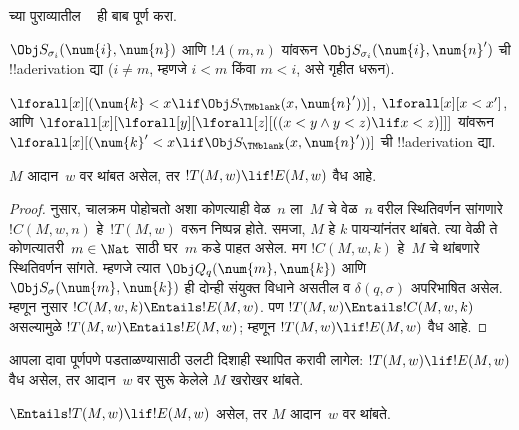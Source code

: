 \documentclass[../../../include/open-logic-section]{subfiles}
\begin{document}
\begin{prob}
च्या पुराव्यातील
~
ही बाब पूर्ण करा.
\end{prob}

\begin{prob}
$\Obj S_{\sigma_i}(\num{i}, \num{n})$
आणि $!A(m, n)$ यांवरून
$\Obj S_{\sigma_i}(\num{i}, \num{n}')$
ची !!a{derivation} द्या
($i \neq
m$, म्हणजे $i < m$
किंवा $m < i$,
असे गृहीत धरून).
\end{prob}

\begin{prob}
$\lforall[x][(\num{k} < x \lif \Obj
  S_\TMblank(x, \num{n}'))]$,
$\lforall[x][x < x']$,
आणि
$\lforall[x][\lforall[y][\lforall[z][ ((x < y \land y < z) \lif x <
      z)]]]$
यांवरून
$\lforall[x][(\num{k}' < x \lif \Obj
  S_\TMblank(x, \num{n}'))]$
ची !!a{derivation} द्या.
\end{prob}


\begin{lem}
$M$ आदान~$w$ वर
थांबत असेल, तर
$!T(M, w) \lif
!E(M, w)$ वैध आहे.
\end{lem}

\begin{proof}
 नुसार,
चालक्रम पोहोचतो अशा कोणत्याही वेळ~$n$
ला~$M$ चे वेळ~$n$ वरील स्थितिवर्णन
सांगणारे~$!C(M, w, n)$
हे~$!T(M, w)$ वरून
निष्पन्न होते. समजा,
$M$ हे $k$ पायऱ्यांनंतर
थांबते. त्या वेळी
ते कोणत्यातरी~$m \in \Nat$
साठी घर~$m$ कडे
पाहत असेल. मग
$!C(M, w, k)$ हे~$M$
चे थांबणारे स्थितिवर्णन
सांगते. म्हणजे त्यात
$\Obj Q_q(\num{m}, \num{k})$
आणि $\Obj
S_\sigma(\num{m}, \num{k})$
ही दोन्ही संयुक्त विधाने
असतील व $\delta(q,\sigma)$
अपरिभाषित असेल. म्हणून
नुसार
$!C(M, w, k) \Entails !E(M,
w)$. पण
$!T(M, w) \Entails !C(M, w, k)$
असल्यामुळे
$!T(M, w)
\Entails !E(M, w)$;
म्हणून $!T(M, w) \lif !E(M, w)$
वैध आहे.
\end{proof}


\begin{explain} 
आपला दावा पूर्णपणे
पडताळण्यासाठी उलटी
दिशाही स्थापित करावी
लागेल: $!T(M, w) \lif !E(M, w)$
वैध असेल, तर
आदान~$w$ वर सुरू
केलेले $M$ खरोखर
थांबते.
\end{explain}

\begin{lem}
$\Entails !T(M, w) \lif !E(M, w)$
असेल, तर $M$
आदान~$w$ वर थांबते.
\end{lem}
\end{document}
